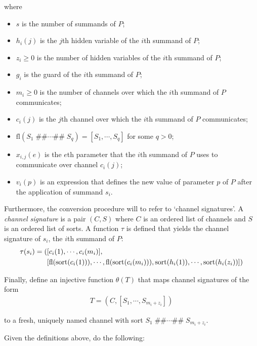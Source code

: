 \begin{itemize}
where

\begin{itemize}
\item $s$ is the number of summands of $P$;
\item $h_i(j)$ is the $j$th hidden variable of the $i$th summand of $P$;
\item $z_i \geq 0$ is the number of hidden variables of the $i$th summand of $P$;
\item $g_i$ is the guard of the $i$th summand of $P$;
\item $m_i \geq 0$ is the number of channels over which the $i$th summand of $P$ communicates;
\item $c_i(j)$ is the $j$th channel over which the $i$th summand of $P$ communicates;
\item $\text{fl}(S_1 \; \texttt{\#\#} \cdots{} \texttt{\#\#} \; S_q) = [S_1, \cdots{}, S_q]$ for some $q > 0$;
\item $x_{i,j}(e)$ is the $e$th parameter that the $i$th summand of $P$ uses to communicate over channel $c_i(j)$;
\item $v_i(p)$ is an expression that defines the new value of parameter $p$ of $P$ after the application of summand $s_i$.
\end{itemize}
\end{itemize}

Furthermore, the conversion procedure will to refer to `channel signatures'.
A \emph{channel signature} is a pair $(C, S)$ where $C$ is an ordered list of channels and $S$ is an ordered list of sorts.
A function $\tau$ is defined that yields the channel signature of $s_i$, the $i$th summand of $P$:
\begin{align*}
\tau(s_i) = (&[ c_i(1), \cdots{}, c_i(m_i)], \\
&[\text{fl}(\text{sort}(c_i(1))), \cdots{}, \text{fl}(\text{sort}(c_i(m_i))), \text{sort}(h_i(1)), \cdots{}, \text{sort}(h_i(z_i))])
\end{align*}

Finally, define an injective function $\theta(T)$ that maps channel signatures of the form
\begin{align*}
T = (C, [S_1, \cdots{}, S_{m_i+z_i}])
\end{align*}

to a fresh, uniquely named channel with sort $S_1 \; \texttt{\#\#} \cdots{} \texttt{\#\#} \; S_{m_i+z_i}$.

Given the definitions above, do the following:

